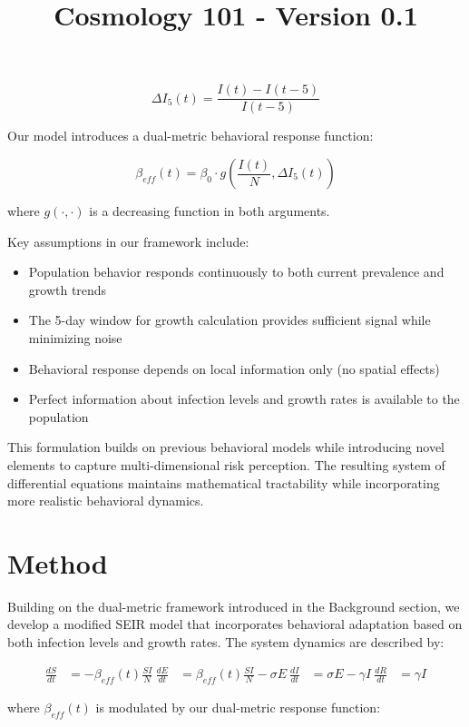 \documentclass{article}\usepackage{graphicx} \usepackage{amsmath} \usepackage{colortbl}\title{Cosmology 101 - Version 0.1}
\begin{document}
\begin{equation}
\Delta I_5(t) = \frac{I(t) - I(t-5)}{I(t-5)}
\end{equation}

Our model introduces a dual-metric behavioral response function:

\begin{equation}
\beta_{eff}(t) = \beta_0 \cdot g\left(\frac{I(t)}{N}, \Delta I_5(t)\right)
\end{equation}

where $g(\cdot,\cdot)$ is a decreasing function in both arguments.

Key assumptions in our framework include:
\begin{itemize}
 \item Population behavior responds continuously to both current prevalence and growth trends
 \item The 5-day window for growth calculation provides sufficient signal while minimizing noise
 \item Behavioral response depends on local information only (no spatial effects)
 \item Perfect information about infection levels and growth rates is available to the population
\end{itemize}

This formulation builds on previous behavioral models \cite{funk2009spread} while introducing novel elements to capture multi-dimensional risk perception. The resulting system of differential equations maintains mathematical tractability while incorporating more realistic behavioral dynamics.\section{Method}
Building on the dual-metric framework introduced in the Background section, we develop a modified SEIR model that incorporates behavioral adaptation based on both infection levels and growth rates. The system dynamics are described by:

\begin{equation}
\begin{aligned}
\frac{dS}{dt} &= -\beta_{eff}(t)\frac{SI}{N} \
\frac{dE}{dt} &= \beta_{eff}(t)\frac{SI}{N} - \sigma E \
\frac{dI}{dt} &= \sigma E - \gamma I \
\frac{dR}{dt} &= \gamma I
\end{aligned}
\end{equation}

where $\beta_{eff}(t)$ is modulated by our dual-metric response function:
\end{document}
